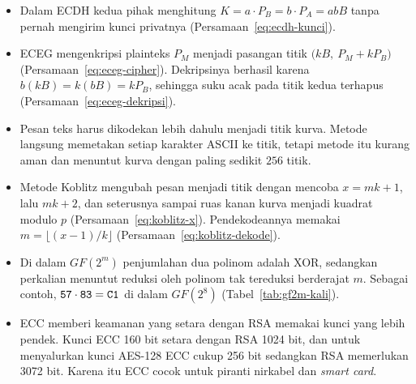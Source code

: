 \begin{itemize}
          publiknya adalah titik $Q = xB$
          (Persamaan~\eqref{eq:ecc-kunci-publik}).
    \item Dalam ECDH kedua pihak menghitung
          $K = a \cdot P_B = b \cdot P_A = abB$ tanpa pernah mengirim kunci
          privatnya (Persamaan~\eqref{eq:ecdh-kunci}).
    \item ECEG mengenkripsi plainteks $P_M$ menjadi pasangan titik
          $\bigl(kB,\ P_M + kP_B\bigr)$ (Persamaan~\eqref{eq:eceg-cipher}).
          Dekripsinya berhasil karena $b(kB) = k(bB) = kP_B$, sehingga suku
          acak pada titik kedua terhapus (Persamaan~\eqref{eq:eceg-dekripsi}).
    \item Pesan teks harus dikodekan lebih dahulu menjadi titik kurva. Metode
          langsung memetakan setiap karakter ASCII ke titik, tetapi metode itu
          kurang aman dan menuntut kurva dengan paling sedikit $256$ titik.
    \item Metode Koblitz mengubah pesan menjadi titik dengan mencoba
          $x = mk + 1$, lalu $mk + 2$, dan seterusnya sampai ruas kanan kurva
          menjadi kuadrat modulo $p$ (Persamaan~\eqref{eq:koblitz-x}).
          Pendekodeannya memakai $m = \lfloor (x-1)/k \rfloor$
          (Persamaan~\eqref{eq:koblitz-dekode}).
    \item Di dalam $GF(2^m)$ penjumlahan dua polinom adalah XOR, sedangkan
          perkalian menuntut reduksi oleh polinom tak tereduksi berderajat $m$.
          Sebagai contoh, $\texttt{57} \cdot \texttt{83} = \texttt{C1}$ di dalam
          $GF(2^8)$ (Tabel~\ref{tab:gf2m-kali}).
    \item ECC memberi keamanan yang setara dengan RSA memakai kunci yang lebih
          pendek. Kunci ECC 160 bit setara dengan RSA 1024 bit, dan untuk
          menyalurkan kunci AES-128 ECC cukup 256 bit sedangkan RSA memerlukan
          3072 bit. Karena itu ECC cocok untuk piranti nirkabel dan
          \textit{smart card}.
\end{itemize}
